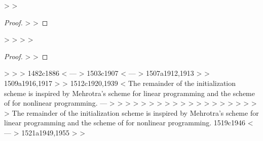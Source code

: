 > 
> \begin{proof}
> 
> \end{proof}
> 
> \thmSuperlinear*
> 
> \begin{proof}
> 
> \end{proof}
> 
> \fi
> 
1482c1886
< %
---
> %
1503c1907
< %
---
> %
1507a1912,1913
> 
> 
1509a1916,1917
> 
> 
1512c1920,1939
< The remainder of the initialization scheme is inspired by Mehrotra's scheme for linear programming \cite[Section 7]{mehrotra1992implementation} and the scheme of \citet*{gertz2004starting} for nonlinear programming. %
---
> 
> 
> %
> 
> %
> %
> 
> %
> %
> %
> %
> %
> 
> %
> %
> %
> %
> %
> %
> The remainder of the initialization scheme is inspired by Mehrotra's scheme for linear programming \cite[Section 7]{mehrotra1992implementation} and the scheme of \citet*{gertz2004starting} for nonlinear programming. %
1519c1946
< %
---
> %
1521a1949,1955
> %
> %
